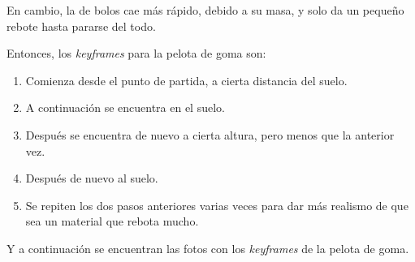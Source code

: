 \documentclass{article}
\begin{document}
En cambio, la de bolos cae más rápido, debido a su masa, y solo da un pequeño rebote hasta pararse del todo.


Entonces, los \textit{keyframes} para la pelota de goma son:

\begin{enumerate}
    \item Comienza desde el punto de partida, a cierta distancia del suelo.
    \item A continuación se encuentra en el suelo.
    \item Después se encuentra de nuevo a cierta altura, pero menos que la anterior vez.
    \item Después de nuevo al suelo.
    \item Se repiten los dos pasos anteriores varias veces para dar más realismo de que sea un material que rebota mucho.
\end{enumerate}

Y a continuación se encuentran las fotos con los \textit{keyframes} de la pelota de goma.
\end{document}
